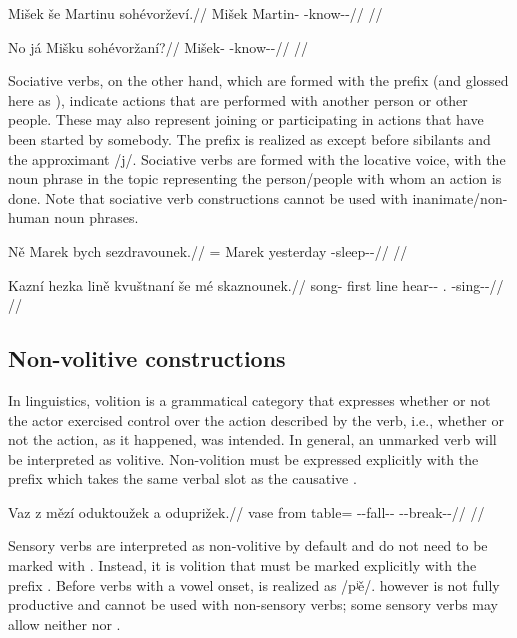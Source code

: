 \pex
\begingl
\gla Mišek še Martinu sohévorževí.//
\glb Mišek \Com{} Martin-\Ins{} \Rec{}-know-\Av{}-\Cont{}//
\glft {}//
\endgl
\xe

\pex
\begingl
\gla No já Mišku sohévoržaní?//
\glb \Q{} \Second{}\Sg{} Mišek-\Ins{} \Rec{}-know-\Av{}-\Ret{}//
\glft {}//
\endgl
\xe

Sociative verbs, on the other hand, which are formed with
the prefix  (and glossed here as \Soc{}), indicate actions that are
performed with another person or other people. These may also represent joining
or participating in actions that have been started by somebody. The prefix
 is realized as  except before sibilants and the approximant
/j/. Sociative verbs are formed with the locative voice, with the noun phrase in
the topic representing the person/people with whom an action is done. Note that
sociative verb constructions cannot be used with inanimate/non-human noun
phrases.

\pex
\begingl
\gla Ně Marek bych sezdravounek.//
\glb \Pl{}= Marek yesterday \Soc{}-sleep-\Lv{}-\Pf{}//
\glft {}//
\endgl
\xe

\pex
\begingl
\gla Kazní hezka lině kvuštnaní še mé skaznounek.//
\glb song-\Gen{} first line hear-\Pv{}-\Ret{} \Com{} \First\Pl{}.\Str{} \Soc{}-sing-\Lv{}-\Pf{}//
\glft {}//
\endgl
\xe

\subsection{Non-volitive constructions}
\label{sec:non-volitive}

In linguistics, {\sc volition} is a grammatical category that expresses whether
or not the actor exercised control over the action described by the verb, i.e.,
whether or not the action, as it happened, was intended. In general, an unmarked
verb will be interpreted as volitive. Non-volition must be expressed explicitly
with the prefix  which takes the same verbal slot as the causative
.

\pex
\begingl
	\gla Vaz z mězí oduktoužek a oduprižek.//
	\glb vase from table=\Gen{} \N{}\Vol{}-\Refl{}-fall-\Av{}-\Pf{} \N{}\Vol{}-\Refl{}-break-\Av{}-\Pf{}//
	\glft {}//
\endgl
\xe

Sensory verbs are interpreted as non-volitive by default and do not need to be
marked with . Instead, it is volition that must be marked explicitly
with the prefix . Before verbs with a vowel onset, \ird{} is realized
as /pʲě/.  however is not fully productive and cannot be used with
non-sensory verbs; some sensory verbs may allow neither  nor .

